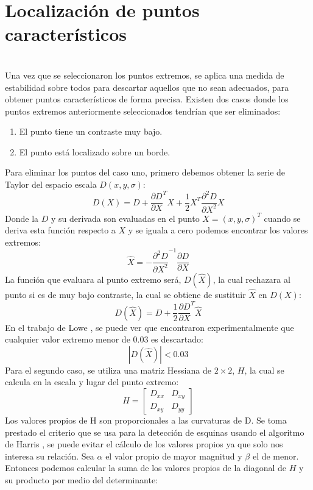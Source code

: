 	

	
	\section{Localización de puntos característicos} \hfill \\ 
		Una vez que se seleccionaron los puntos extremos, se aplica una medida de estabilidad sobre todos para descartar aquellos que no sean adecuados, para obtener puntos  característicos de forma precisa. Existen dos casos donde los puntos extremos anteriormente seleccionados tendrían que ser eliminados:
	\begin{enumerate}
		\item El punto tiene un contraste muy bajo.
		\item El punto está localizado sobre un borde.
	\end{enumerate}			
	Para eliminar los puntos del caso uno, primero debemos obtener la serie de Taylor del espacio escala $D(x,y,\sigma)$:
		$$D(X)=D +\frac{\partial D}{\partial X}^T X+ \frac{1}{2} X^T\frac{\partial^2 D}{\partial X^2} X $$
		Donde la $D$ y su derivada son evaluadas en el punto $X = (x,y,\sigma)^T$ cuando se deriva esta función respecto a $X$ y se iguala a cero podemos encontrar los valores extremos: 
	    $$ \hat{X} = - \frac{\partial^2 D}{\partial X^2}^{-1}\frac{\partial D}{\partial X}$$
	 	La función que evaluara al punto extremo será, $D(\hat{X})$, la cual rechazara al punto si es de muy bajo contraste, la cual se obtiene de sustituir $\hat{X}$ en $D(X)$:
	 	$$D(\hat{X})=D + \frac{1}{2} \frac{\partial D}{\partial X}^T \hat{X} $$ 	 
	 	En el trabajo de Lowe \cite{Lowe2004}, se  puede ver que encontraron experimentalmente que cualquier valor extremo menor de 0.03 es descartado:
	 	$$ |D(\hat{X})|< 0.03$$ 	 
	 	Para el segundo caso, se utiliza una matriz Hessiana de $2\times2$, $H$, la cual se calcula en la escala y lugar del punto extremo:
		$$ 
		H
		=
		\begin{bmatrix}
			D_{xx} & D_{xy}\\
    		D_{xy} & D_{yy}
		\end{bmatrix}		 	
		$$	
		Los valores propios de H son proporcionales a las curvaturas de D. Se toma prestado el criterio que se usa para la detección de esquinas usando el algoritmo de Harris \cite{Harris1988}, se puede evitar el cálculo de los valores propios ya que solo nos interesa su relación. Sea $\alpha$ el valor propio de mayor magnitud y $\beta$ el de menor. Entonces podemos calcular la suma de los valores propios de la diagonal de $H$ y su producto por medio del determinante:
